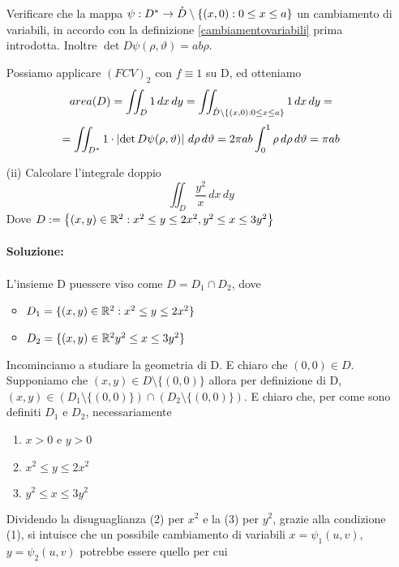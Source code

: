 \begin{exercise}
\begin{itemize}
\begin{exercise}
                 Verificare che la mappa $\psi : D^* \to \mathring{D}\setminus\{(x,0):0\leq x\leq a\}$
                 \ace un cambiamento di variabili, in accordo con la definizione \ref{cambiamentovariabili} prima introdotta. 
                 Inoltre $\det D\psi(\rho,\vartheta) = ab\rho$.
               \end{exercise}
               Possiamo applicare $(FCV)_2$ con $f\equiv 1$ su D, ed otteniamo
              $$area(D) = \iint_{D} 1 \,dx\,dy = \iint_{\mathring{D}\setminus\{(x,0):0\leq x\leq a\}} 1 \,dx \,dy =$$
              $$= \iint_{D^*} 1 \cdot \left\lvert \det D\psi(\rho, \vartheta) \right\rvert \,d\rho\,d\vartheta = 
              2\pi ab \int_{0}^{1} \rho \,d\rho\,d\vartheta = \pi ab$$
    \item[(ii)] Calcolare l'integrale doppio $$\iint_{D} \frac{y^2}{x} \,dx \,dy$$
                Dove $D:=\left\{(x,y)\in\mathbb{R}^2 : x^2 \leq y \leq 2x^2, y^2 \leq x \leq 3y^2\right\}$ \\\\
                \textbf{Soluzione:}\\\\
                L'insieme D pu\aco essere viso come $D = D_1 \cap D_2$, dove 
                \begin{itemize}
                  \item $D_1 = \{(x,y)\in\mathbb{R}^2 : x^2 \leq y \leq 2x^2\}$
                  \item $D_2 = \{(x,y)\in\mathbb{R}^2y^2 \leq x \leq 3y^2\}$
                \end{itemize}
                Incominciamo a studiare la geometria di D. \ac{E} chiaro che $(0,0)\in D$. Supponiamo che 
                $(x,y)\in D\setminus\{(0,0)\}$ allora per definizione di D, 
                $(x,y)\in \left(D_1\setminus\{(0,0)\}\right) \cap \left(D_2 \setminus \{(0,0)\}\right)$. \ac{E} chiaro
                che, per come sono definiti $D_1$ e $D_2$, necessariamente 
                \begin{enumerate}
                  \item $x>0$ e $y>0$
                  \item $x^2 \leq y\leq 2x^2$
                  \item $y^2\leq x\leq 3y^2$
                \end{enumerate}
                Dividendo la disuguaglianza (2) per $x^2$ e la (3) per $y^2$, grazie alla condizione (1), si intuisce
                che un possibile cambiamento di variabili $x=\psi_1(u,v)$, $y = \psi_2(u,v)$ potrebbe essere 
                quello per cui 

\end{itemize}
\end{exercise}
